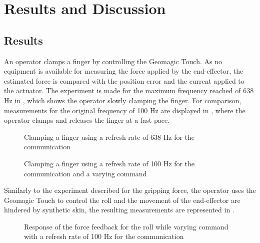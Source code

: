 \chapter{Results and Discussion}\label{cha:discussion}





\section{Results}



An operator clamps a finger by controlling the Geomagic Touch. As no equipment is available for measuring the force applied by the end-effector, the estimated force is compared with the position error and the current applied to the actuator. The experiment is made for the maximum frequency reached of 638 Hz in , which shows the operator slowly clamping the finger. For comparison, measurements for the original frequency of 100 Hz are displayed in , where the operator clamps and releases the finger at a fast pace.

\begin{figure}[H]
  
  \caption{Clamping a finger using a refresh rate of 638 Hz for the communication}
  \label{fig:fbkm}
\end{figure}

\begin{figure}[H]
  
  \caption{Clamping a finger using a refresh rate of 100 Hz for the communication and a varying command}
  \label{fig:fbkm_100}
\end{figure}

Similarly to the experiment described for the gripping force, the operator uses the Geomagic Touch to control the roll and the movement of the end-effector are hindered by synthetic skin, the resulting measurements are represented in .
\begin{figure}[H]
  
  \caption{Response of the force feedback for the roll while varying command with a refresh rate of 100 Hz for the communication}
  \label{fig:fbkm_roll_100}
\end{figure}

